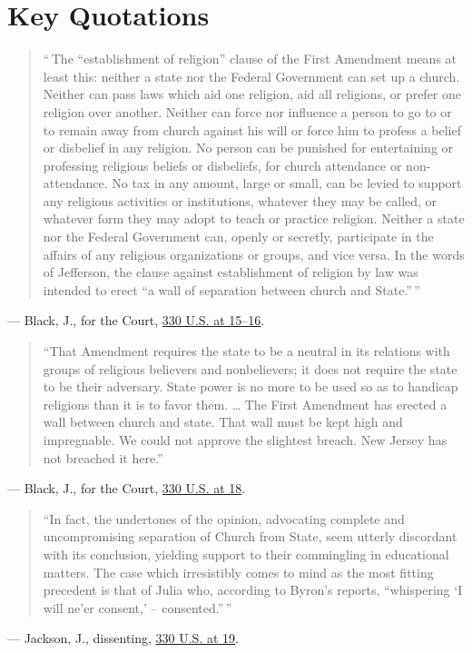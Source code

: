 \documentclass[12pt]{article}
\begin{document}
\section{Key Quotations}
\begin{quote}
``\,The ``establishment of religion'' clause of the First Amendment means at least this: neither a state nor the Federal Government can set up a church. Neither can pass laws which aid one religion, aid all religions, or prefer one religion over another. Neither can force nor influence a person to go to or to remain away from church against his will or force him to profess a belief or disbelief in any religion. No person can be punished for entertaining or professing religious beliefs or disbeliefs, for church attendance or non-attendance. No tax in any amount, large or small, can be levied to support any religious activities or institutions, whatever they may be called, or whatever form they may adopt to teach or practice religion. Neither a state nor the Federal Government can, openly or secretly, participate in the affairs of any religious organizations or groups, and vice versa. In the words of Jefferson, the clause against establishment of religion by law was intended to erect ``a wall of separation between church and State.''\,''
\end{quote}
\noindent --- Black, J., for the Court, \href{https://supreme.justia.com/cases/federal/us/330/1/}{330 U.S. at 15--16}.

\begin{quote}
``That Amendment requires the state to be a neutral in its relations with groups of religious believers and nonbelievers; it does not require the state to be their adversary. State power is no more to be used so as to handicap religions than it is to favor them. \ldots{} The First Amendment has erected a wall between church and state. That wall must be kept high and impregnable. We could not approve the slightest breach. New Jersey has not breached it here.''
\end{quote}
\noindent --- Black, J., for the Court, \href{https://supreme.justia.com/cases/federal/us/330/1/}{330 U.S. at 18}.

\begin{quote}
``In fact, the undertones of the opinion, advocating complete and uncompromising separation of Church from State, seem utterly discordant with its conclusion, yielding support to their commingling in educational matters. The case which irresistibly comes to mind as the most fitting precedent is that of Julia who, according to Byron's reports, ``whispering `I will ne'er consent,' -- consented.''\,''
\end{quote}
\noindent --- Jackson, J., dissenting, \href{https://supreme.justia.com/cases/federal/us/330/1/}{330 U.S. at 19}.
\end{document}
